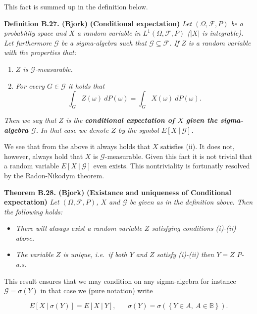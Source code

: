 \documentclass[a4paper,10pt,openany]{book}
\providecommand{\tightlist}{%
 \setlength{\itemsep}{0pt}\setlength{\parskip}{0pt}}
\begin{document}
This fact is summed up in the definition below.

\textbf{Definition B.27. (Bjork)} \textbf{(Conditional expectation)} \emph{Let \((\Omega,\mathcal{F},P)\) be a probability space and \(X\) a random variable in \(L^1(\Omega,\mathcal{F},P)\) (\(\vert X\vert\) is integrable). Let furthermore \(\mathcal{G}\) be a sigma-algebra such that \(\mathcal{G}\subseteq \mathcal{F}\). If \(Z\) is a random variable with the properties that:}

\begin{enumerate}
\def\labelenumi{\roman{enumi}.}
\tightlist
\item
  \emph{\(Z\) is \(\mathcal{G}\)-measurable.}
\item
  \emph{For every \(G\in\mathcal{G}\) it holds that}
  \[\int_G Z(\omega)\ dP(\omega)=\int_G X(\omega)\ dP(\omega).\tag{B.5}\]
\end{enumerate}

\emph{Then we say that \(Z\) is the \textbf{conditional expectation of \(X\) given the sigma-algebra \(\mathcal{G}\)}. In that case we denote \(Z\) by the symbol \(E[X\ \vert\ \mathcal{G}]\).}

We see that from the above it always holds that \(X\) satisfies (ii). It does not, however, always hold that \(X\) is \(\mathcal{G}\)-measurable. Given this fact it is not trivial that a random variable \(E[X\ \vert\ \mathcal{G}]\) even exists. This nontriviality is fortunatly resolved by the Radon-Nikodym theorem.

\textbf{Theorem B.28. (Bjork)} \textbf{(Existance and uniqueness of Conditional expectation)} \emph{Let \((\Omega,\mathcal{F},P)\), \(X\) and \(\mathcal{G}\) be given as in the definition above. Then the following holds:}

\begin{itemize}
\tightlist
\item
  \emph{There will always exist a random variable \(Z\) satisfying conditions (i)-(ii) above.}
\item
  \emph{The variable \(Z\) is unique, i.e.~if both \(Y\) and \(Z\) satisfy (i)-(ii) then \(Y=Z\) \(P\)-a.s.}
\end{itemize}

This result ensures that we may condition on any sigma-algebra for instance \(\mathcal{G}=\sigma(Y)\) in that case we (pure notation) write

\[
E[X\ \vert\ \sigma(Y)]=E[X\ \vert\ Y],\hspace{20pt}\sigma(Y)=\sigma\left(\left\{ Y\in A,\ A\in\mathbb{B}\right\}\right).
\]
\end{document}
